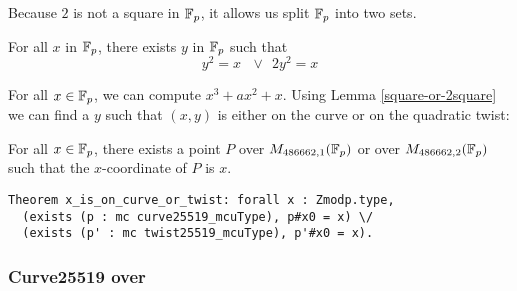 Because $2$ is not a square in $\mathbb{F}_{p}$, it allows us split $\mathbb{F}_{p}$ into two sets.
\begin{lemma}
\label{square-or-2square}
For all $x$ in $\mathbb{F}_{p}$, there exists $y$ in $\mathbb{F}_{p}$ such that
$$y^2 = x\ \ \ \lor\ \ 2y^2 = x$$
\end{lemma}
For all $x \in \mathbb{F}_{p}$, we can compute $x^3 + ax^2 + x$. Using Lemma \ref{square-or-2square} we can find a $y$ such that $(x,y)$ is either on the curve or on the quadratic twist:
\begin{lemma}
\label{curve-or-twist}
For all $x \in \mathbb{F}_{p}$, there exists a point $P$ over $M_{486662,1}(\mathbb{F}_{p})$ or over $M_{486662,2}(\mathbb{F}_{p})$ such that the $x$-coordinate of $P$ is $x$.
\end{lemma}
\begin{lstlisting}[language=Coq]
Theorem x_is_on_curve_or_twist: forall x : Zmodp.type,
  (exists (p : mc curve25519_mcuType), p#x0 = x) \/
  (exists (p' : mc twist25519_mcuType), p'#x0 = x).
\end{lstlisting}

\subsubsection{Curve25519 over }


